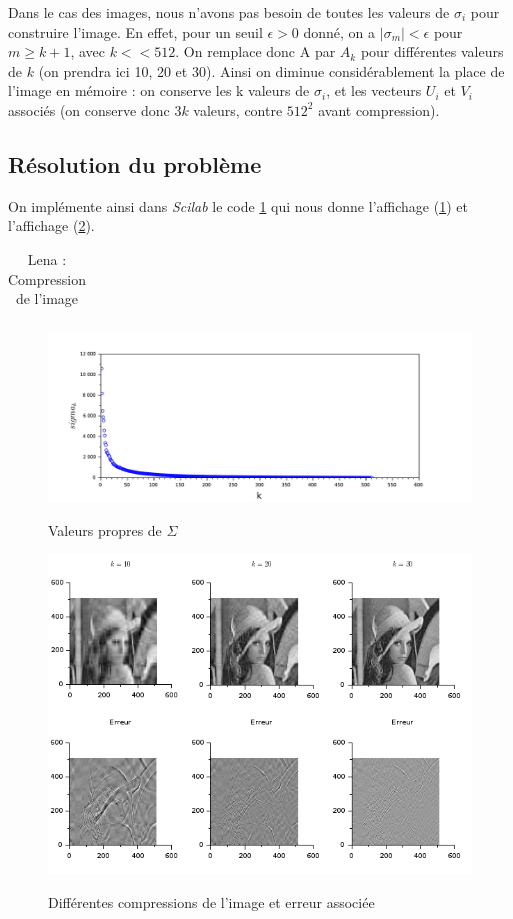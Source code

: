 \documentclass[a4paper,10pt]{report}
\begin{document}
\indent Dans le cas des images, nous n'avons pas besoin de toutes les valeurs de $\sigma_i$ pour construire l'image. En effet, pour un seuil $\epsilon>0$ donné, on a $|\sigma_m|<\epsilon$ pour $m\geq k+1$, avec $k<<512$. On remplace donc A par $A_k$ pour différentes valeurs de $k$ (on prendra ici 10, 20 et 30). Ainsi on diminue considérablement la place de l'image en mémoire : on conserve les k valeurs  de $\sigma_i$, et les vecteurs $U_i$ et $V_i$ associés (on conserve donc $3k$ valeurs, contre $512^2$ avant compression). \\

\subsection{Résolution du problème}
\indent On implémente ainsi dans \textit{Scilab} le code \ref{lena} qui nous donne l'affichage (\ref{valeur_propre}) et l'affichage (\ref{compression}).
\begin{table}[H]
\caption{Lena : Compression de l'image}
\begin{tabular}{l}

\label{lena}
\end{tabular}
\end{table}

\begin{figure}[H]
\centering
\caption{Valeurs propres de $\Sigma$}
\includegraphics[width=\textwidth]{valeur_propre.pdf}
\label{valeur_propre}
\end{figure}

\begin{figure}[H]
\centering
\caption{Différentes compressions de l'image et erreur associée}
\includegraphics[width=\textwidth]{lena_pg1.png}
\label{compression}
\end{figure}
\end{document}
